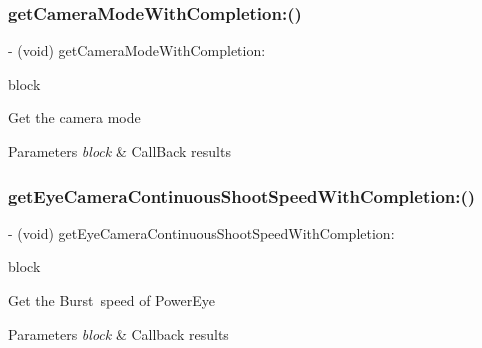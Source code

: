 \subsubsection{\texorpdfstring{get\+Camera\+Mode\+With\+Completion\+:()}{getCameraModeWithCompletion:()}}
{\footnotesize\ttfamily -\/ (void) get\+Camera\+Mode\+With\+Completion\+: \begin{DoxyParamCaption}\item[{(void($^\wedge$)(P\+V\+Camera\+Mode camera\+Mode))}]{block }\end{DoxyParamCaption}}

Get the camera mode


\begin{DoxyParams}{Parameters}
{\em block} & Call\+Back results \\
\hline
\end{DoxyParams}
\mbox{\label{interface_p_v_camera_a57c31eca4c7f48c0a9b422d2193640fe}} 
\subsubsection{\texorpdfstring{get\+Eye\+Camera\+Continuous\+Shoot\+Speed\+With\+Completion\+:()}{getEyeCameraContinuousShootSpeedWithCompletion:()}}
{\footnotesize\ttfamily -\/ (void) get\+Eye\+Camera\+Continuous\+Shoot\+Speed\+With\+Completion\+: \begin{DoxyParamCaption}\item[{(void($^\wedge$)(P\+V\+Eye\+Camera\+Continuous\+Shoot\+Speed shoot\+Speed, N\+S\+Error $\ast$\hyperlink{group___p_v_s_d_k___c_o_r_e___a_p_i___m_o_u_n_t_c_o_n_t_r_o_l_ga5a1de33b230662127568783314b4a54d}{\+\_\+\+Nullable} error))}]{block }\end{DoxyParamCaption}}

Get the Burst speed of Power\+Eye


\begin{DoxyParams}{Parameters}
{\em block} & Callback results \\
\hline
\end{DoxyParams}
\mbox{\label{interface_p_v_camera_a56f58cce05dda8ec299c4bdf0d19fcc1}} 
